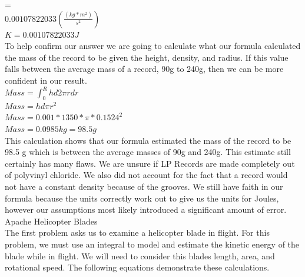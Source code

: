 \documentclass[a4paper, 11pt, oneside]{book} %
\begin{document}
{\large{=}\\
\vspace{0.5\baselineskip} %
$0.00107822033(\frac{(kg * m^2)}{s^2})$\\
\vspace{0.5\baselineskip} %
$K = 0.00107822033 J$\\
\vspace{0.5\baselineskip} %
To help confirm our answer we are going to calculate what our formula calculated the mass of the record to be given the height, density, and radius. If this value falls between the average mass of a record, 90g to 240g, then we can be more confident in our result.\\
\vspace{0.5\baselineskip} %
$Mass =  \int_{0}^{R} hd2\pi r dr$\\
\vspace{0.5\baselineskip} %
$Mass = hd\pi r^2$\\
\vspace{0.5\baselineskip} %
$Mass = 0.001 * 1350 * \pi * 0.1524^2$\\
\vspace{0.5\baselineskip} %
$Mass = 0.0985kg = 98.5g$\\
\vspace{0.5\baselineskip} %
This calculation shows that our formula estimated the mass of the record to be 98.5 g which is between the average masses of 90g and 240g. This estimate still certainly has many flaws. We are unsure if LP Records are made completely out of polyvinyl chloride. We also did not account for the fact that a record would not have a constant density because of the grooves. We still have faith in our formula because the units correctly work out to give us the units for Joules, however our assumptions most likely introduced a significant amount of error. \\
\pagebreak
\centering %
{\LARGE Apache Helicopter Blades\\} %
\vspace{0.5\baselineskip} %
The first problem asks us to examine a helicopter blade in flight. For this problem, we must use an integral to model and estimate the kinetic energy of the blade while in flight. We will need to consider this blades length, area, and rotational speed. The following equations demonstrate these calculations. \\
}
\end{document}
